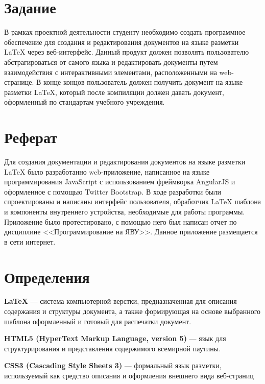 \documentclass[14pt,a4paper]{report}
\makeatletter
\newif\if@prechapterused
\let\oldchapter\chapter
\renewcommand{\chapter}[1]
{
\if@prechapterused\vspace{-2em}\@prechapterusedfalse\fi
\begingroup
	\let\clearpage\relax
	\let\cleardoublepage\relax
	\oldchapter{#1}
\endgroup
}
\makeatother
\begin{document}
\newpage

\vspace*{-3em}

\chapter{Задание}
В рамках проектной деятельности студенту необходимо создать программное 
обеспечение для создания и редактирования документов на языке разметки LaTeX через веб-интерфейс.
Данный продукт должен позволять пользователю абстрагироваться от самого языка и редактировать документы
путем взаимодействия с интерактивными элементами, расположенными на web-странице. В конце концов пользователь
должен получить документ на языке разметки LaTeX, который после компиляции должен давать документ, оформленный
по стандартам учебного учреждения.

\chapter{Реферат}
Для создания документации и редактирования документов на языке разметки LaTeX было разработанно web-приложение, написанное на языке программирования JavaScript с использованием фреймворка AngularJS и оформленное с помощью Twitter Bootstrap. В ходе разработки были спроектированы и написаны интерфейс пользователя, обработчик LaTeX шаблона и компоненты внутреннего устройства, необходимые для работы программы. Приложение было протестировано, с помощью него был написан отчет по дисциплине <<Программирование на ЯВУ>>. Данное приложение размещается в сети интернет.

\newpage

\tableofcontents
\newpage

\vspace*{-12pt}
\chapter{Определения}
\textbf{LaTeX} --- система компьютерной верстки, предназначенная для описания содержания и структуры документа,
а также формирующая на основе выбранного шаблона оформленный и готовый для распечатки документ.

\textbf{HTML5 (HyperText Markup Language, version 5)} --- язык для 
структурирования и 
представления содержимого всемирной паутины.

\textbf{CSS3 (Cascading Style Sheets 3)} --- формальный язык разметки, 
используемый как 
средство описания и оформления внешнего вида веб-страниц
\end{document}
